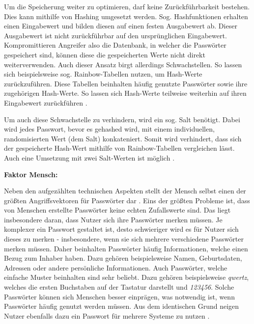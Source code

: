     Um die Speicherung weiter zu optimieren, darf keine Zurückführbarkeit bestehen. Dies kann mithilfe von Hashing umgesetzt werden. Sog. Hashfunktionen erhalten einen Eingabewert und bilden diesen auf einen festen Ausgabewert ab. Dieser Ausgabewert ist nicht zurückführbar auf den ursprünglichen Eingabewert. Kompromittieren Angreifer also die Datenbank, in welcher die Passwörter gespeichert sind, können diese die gespeicherten Werte nicht direkt weiterverwenden. Auch dieser Ansatz birgt allerdings Schwachstellen. So lassen sich beispielsweise sog. Rainbow-Tabellen nutzen, um Hash-Werte zurückzuführen. Diese Tabellen beinhalten häufig genutzte Passwörter sowie ihre zugehörigen Hash-Werte. So lassen sich Hash-Werte teilweise weiterhin auf ihren Eingabewert zurückführen \cite{chanda2016password}.

    Um auch diese Schwachstelle zu verhindern, wird ein sog. Salt benötigt. Dabei wird jedes Passwort, bevor es gehashed wird, mit einem individuellen, randomisierten Wert (dem Salt) konkateniert. Somit wird verhindert, dass sich der gespeicherte Hash-Wert mithilfe von Rainbow-Tabellen vergleichen lässt. Auch eine Umsetzung mit zwei Salt-Werten ist möglich \cite{chanda2016password}.

\textbf{Faktor Mensch:}

Neben den aufgezählten technischen Aspekten stellt der Mensch selbst einen der größten Angriffsvektoren für Passwörter dar \cite{ives2004domino} \cite{yildirim2019encouraging}. Eins der größten Probleme ist, dass von Menschen erstellte Passwörter keine echten Zufallswerte sind. Das liegt insbesondere daran, dass Nutzer sich ihre Passwörter merken müssen. Je komplexer ein Passwort gestaltet ist, desto schwieriger wird es für Nutzer sich dieses zu merken - insbesondere, wenn sie sich mehrere verschiedene Passwörter merken müssen. Daher beinhalten Passwörter häufig Informationen, welche einen Bezug zum Inhaber haben. Dazu gehören beispielsweise Namen, Geburtsdaten, Adressen oder andere persönliche Informationen. Auch Passwörter, welche einfache Muster beinhalten sind sehr beliebt. Dazu gehören beispielsweise \textit{qwertz}, welches die ersten Buchstaben auf der Tastatur darstellt und \textit{123456}. Solche Passwörter können sich Menschen besser einprägen, was notwendig ist, wenn Passwörter häufig genutzt werden müssen. Aus dem identischen Grund neigen Nutzer ebenfalls dazu ein Passwort für mehrere Systeme zu nutzen \cite{boonkrong2012security} \cite{chanda2016password} \cite{yildirim2019encouraging}. 

